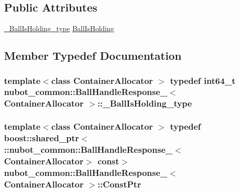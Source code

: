 \subsection*{Public Attributes}
\begin{DoxyCompactItemize}
\item 
\hyperlink{structnubot__common_1_1BallHandleResponse___a35b16dc16cbb5dcae7abe8d9212b86bf}{\-\_\-\-Ball\-Is\-Holding\-\_\-type} \hyperlink{structnubot__common_1_1BallHandleResponse___a7a94fe09f1ce27bdeafd48ac620390a2}{Ball\-Is\-Holding}
\end{DoxyCompactItemize}


\subsection{Member Typedef Documentation}
\hypertarget{structnubot__common_1_1BallHandleResponse___a35b16dc16cbb5dcae7abe8d9212b86bf}{
\subsubsection[{\-\_\-\-Ball\-Is\-Holding\-\_\-type}]{\setlength{\rightskip}{0pt plus 5cm}template$<$class Container\-Allocator $>$ typedef int64\-\_\-t {\bf nubot\-\_\-common\-::\-Ball\-Handle\-Response\-\_\-}$<$ Container\-Allocator $>$\-::{\bf \-\_\-\-Ball\-Is\-Holding\-\_\-type}}}\label{structnubot__common_1_1BallHandleResponse___a35b16dc16cbb5dcae7abe8d9212b86bf}
\hypertarget{structnubot__common_1_1BallHandleResponse___a4f766babaf9b776e70c34ba0f69bbd52}{
\subsubsection[{Const\-Ptr}]{\setlength{\rightskip}{0pt plus 5cm}template$<$class Container\-Allocator $>$ typedef boost\-::shared\-\_\-ptr$<$ \-::{\bf nubot\-\_\-common\-::\-Ball\-Handle\-Response\-\_\-}$<$Container\-Allocator$>$ const$>$ {\bf nubot\-\_\-common\-::\-Ball\-Handle\-Response\-\_\-}$<$ Container\-Allocator $>$\-::{\bf Const\-Ptr}}}\label{structnubot__common_1_1BallHandleResponse___a4f766babaf9b776e70c34ba0f69bbd52}
